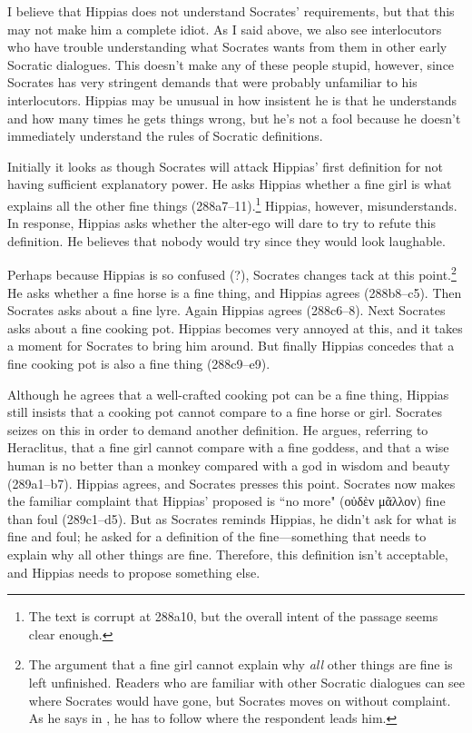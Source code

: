 \documentclass[12pt]{article}
\begin{document}
I believe that Hippias does not understand Socrates' requirements, but that this may not make him a complete idiot.  As I said above, we also see interlocutors who have trouble understanding what Socrates wants from them in other early Socratic dialogues.  This doesn't make any of these people stupid, however, since Socrates has very stringent demands that were probably unfamiliar to his interlocutors.  Hippias may be unusual in how insistent he is that he understands and how many times he gets things wrong, but he's not a fool because he doesn't immediately understand the rules of Socratic definitions.

Initially it looks as though Socrates will attack Hippias' first definition for not having sufficient explanatory power.  He asks Hippias whether a fine girl is what explains all the other fine things (288a7--11).\footnote{The text is corrupt at 288a10, but the overall intent of the passage seems clear enough.}  Hippias, however, misunderstands.  In response, Hippias asks whether the alter-ego will dare to try to refute this definition.  He believes that nobody would try since they would look laughable.

Perhaps because Hippias is so confused (?), Socrates changes tack at this point.\footnote{The argument that a fine girl cannot explain why \emph{all} other things are fine is left unfinished.  Readers who are familiar with other Socratic dialogues can see where Socrates would have gone, but Socrates moves on without complaint.  As he says in , he has to follow where the respondent leads him.}  He asks whether a fine horse is a fine thing, and Hippias agrees (288b8--c5).  Then Socrates asks about a fine lyre. Again Hippias agrees (288c6--8).  Next Socrates asks about a fine cooking pot.  Hippias becomes very annoyed at this, and it takes a moment for Socrates to bring him around.  But finally Hippias concedes that a fine cooking pot is also a fine thing (288c9--e9).

Although he agrees that a well-crafted cooking pot can be a fine thing, Hippias still insists that a cooking pot cannot compare to a fine horse or girl.  Socrates seizes on this in order to demand another definition.  He argues, referring to Heraclitus, that a fine girl cannot compare with a fine goddess, and that a wise human is no better than a monkey compared with a god in wisdom and beauty (289a1--b7).  Hippias agrees, and Socrates presses this point.  Socrates now makes the familiar complaint that Hippias' proposed  is ``no more" ({\g οὐδὲν μᾶλλον}) fine than foul (289c1--d5).  But as Socrates reminds Hippias, he didn't ask for what is fine and foul; he asked for a definition of the fine---something that needs to explain why all other things are fine.  Therefore, this definition isn't acceptable, and Hippias needs to propose something else.
\end{document}
